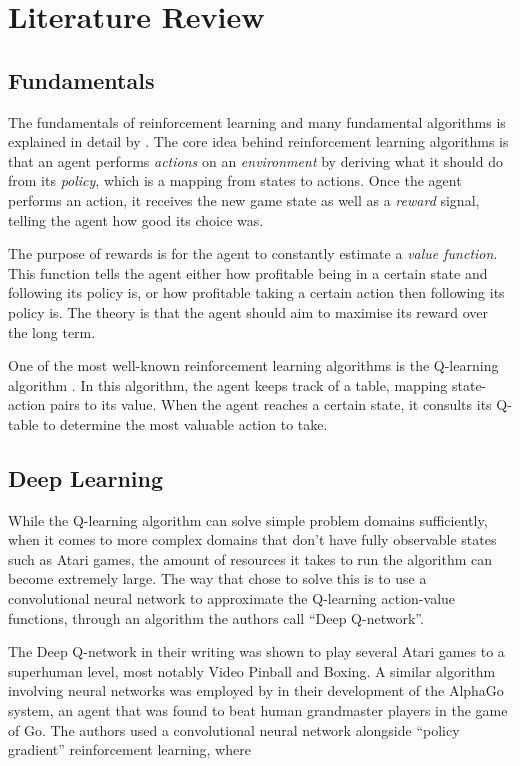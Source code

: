 \documentclass[11pt,a4paper]{article}
\begin{document}
    \section{Literature Review}
    \subsection{Fundamentals}
    The fundamentals of reinforcement learning and many fundamental algorithms is explained in detail by \cite{sutton18}. The core idea behind reinforcement learning algorithms is that an agent performs \emph{actions} on an \emph{environment} by deriving what it should do from its \emph{policy}, which is a mapping from states to actions. Once the agent performs an action, it receives the new game state as well as a \emph{reward} signal, telling the agent how good its choice was.

    The purpose of rewards is for the agent to constantly estimate a \emph{value function}. This function tells the agent either how profitable being in a certain state and following its policy is, or how profitable taking a certain action then following its policy is. The theory is that the agent should aim to maximise its reward over the long term.

    One of the most well-known reinforcement learning algorithms is the Q-learning algorithm \cite[Chapter~6.5]{sutton18}. In this algorithm, the agent keeps track of a table, mapping state-action pairs to its value. When the agent reaches a certain state, it consults its Q-table to determine the most valuable action to take.

    \subsection{Deep Learning}
    While the Q-learning algorithm can solve simple problem domains sufficiently, when it comes to more complex domains that don't have fully observable states such as Atari games, the amount of resources it takes to run the algorithm can become extremely large. The way that \cite{mnih15} chose to solve this is to use a convolutional neural network to approximate the Q-learning action-value functions, through an algorithm the authors call ``Deep Q-network''.

    The Deep Q-network in their writing was shown to play several Atari games to a superhuman level, most notably Video Pinball and Boxing. A similar algorithm involving neural networks was employed by \cite{silver16} in their development of the AlphaGo system, an agent that was found to beat human grandmaster players in the game of Go. The authors used a convolutional neural network alongside ``policy gradient'' reinforcement learning, where
\end{document}

